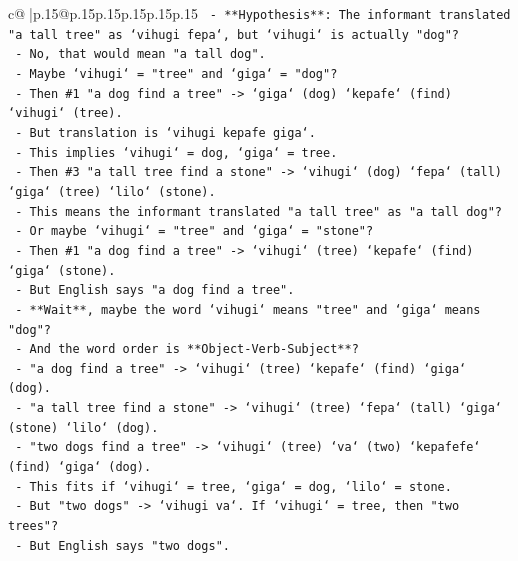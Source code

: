 \documentclass{article}
\begin{document}
{\begin{supertabular}{c@{$\;$}|p{.15\linewidth}@{}p{.15\linewidth}p{.15\linewidth}p{.15\linewidth}p{.15\linewidth}p{.15\linewidth}}
{{{\texttt{                {-}   **Hypothesis**: The informant translated "a tall tree" as `vihugi fepa`, but `vihugi` is actually "dog"?} \\
\texttt{                {-}   No, that would mean "a tall dog".} \\
\texttt{                {-}   Maybe `vihugi` = "tree" and `giga` = "dog"?} \\
\texttt{                {-}   Then \#1 "a dog find a tree" {-}> `giga` (dog) `kepafe` (find) `vihugi` (tree).} \\
\texttt{                {-}   But translation is `vihugi kepafe giga`.} \\
\texttt{                {-}   This implies `vihugi` = dog, `giga` = tree.} \\
\texttt{                {-}   Then \#3 "a tall tree find a stone" {-}> `vihugi` (dog) `fepa` (tall) `giga` (tree) `lilo` (stone).} \\
\texttt{                {-}   This means the informant translated "a tall tree" as "a tall dog"?} \\
\texttt{                {-}   Or maybe `vihugi` = "tree" and `giga` = "stone"?} \\
\texttt{                {-}   Then \#1 "a dog find a tree" {-}> `vihugi` (tree) `kepafe` (find) `giga` (stone).} \\
\texttt{                {-}   But English says "a dog find a tree".} \\
\texttt{                {-}   **Wait**, maybe the word `vihugi` means "tree" and `giga` means "dog"?} \\
\texttt{                {-}   And the word order is **Object{-}Verb{-}Subject**?} \\
\texttt{                {-}   "a dog find a tree" {-}> `vihugi` (tree) `kepafe` (find) `giga` (dog).} \\
\texttt{                {-}   "a tall tree find a stone" {-}> `vihugi` (tree) `fepa` (tall) `giga` (stone) `lilo` (dog).} \\
\texttt{                {-}   "two dogs find a tree" {-}> `vihugi` (tree) `va` (two) `kepafefe` (find) `giga` (dog).} \\
\texttt{                {-}   This fits if `vihugi` = tree, `giga` = dog, `lilo` = stone.} \\
\texttt{                {-}   But "two dogs" {-}> `vihugi va`. If `vihugi` = tree, then "two trees"?} \\
\texttt{                {-}   But English says "two dogs".} \\
}}}
\end{supertabular}}
\end{document}
